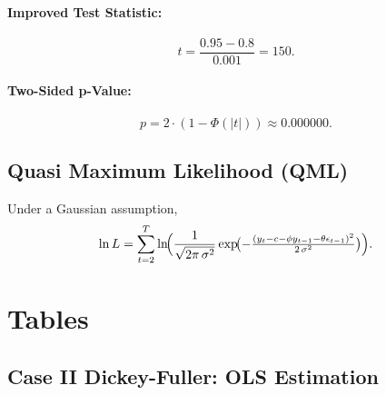 \documentclass[a4paper,12pt]{article}
\begin{document}
\paragraph{Improved Test Statistic:}
\begin{equation}
    t = \frac{0.95 - 0.8}{0.001} = 150.
    \label{eq:tstatmltwo}
\end{equation}

\paragraph{Two-Sided p-Value:}
\begin{equation}
    p = 2 \cdot \left(1 - \Phi(|t|)\right) \approx 0.000000.
\end{equation}

\subsection{Quasi Maximum Likelihood (QML)}

Under a Gaussian assumption,
\begin{equation}
    \ln L 
    = \sum_{t=2}^{T} 
      \ln \!\Bigl(
         \frac{1}{\sqrt{2\pi \,\sigma^2}} 
         \exp\!\bigl(-\tfrac{(y_t - c - \phi y_{t-1} - \theta \epsilon_{t-1})^2}{2 \,\sigma^2}\bigr)
      \Bigr).
    \label{eq:QML}
\end{equation}

\clearpage
\section{Tables}

\subsection{Case II Dickey-Fuller: OLS Estimation}

\begin{table}[H]
\centering
{}
\caption{Parameter estimates and their standard errors for the alternative hypothesis.}
\label{tab:parameter_estimates}
\end{table}
\end{document}
